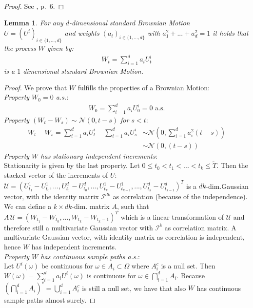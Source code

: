 \documentclass[12pt]{article}
\newtheorem{lemma}[theorem]{Lemma}
\begin{document}
	\begin{proof}
		See \cite{fima2Lecture}, p.\ 6. %
	\end{proof}
	\begin{lemma}\label{lm:linearcombiofbmisbm}
		For any $d$-dimensional standard Brownian Motion $U = (U^i)_{i\in\{1, ..., d\}}$ and weights $(a_i)_{i\in\{1,..., d\}}$ with $a^2_1 + ... + a^2_d = 1$ it holds that the process $W$ given by:
		\begin{align*}
			W_t = \sum_{i=1}^{d}a_iU^i_t
		\end{align*}
		is a $1$-dimensional standard Brownian Motion.
	\end{lemma} 
	\begin{proof}
		We prove that $W$ fulfills the properties of a Brownian Motion:\\
		\emph{Property $W_0=0$ a.s.}:
		\begin{align*}
			W_0 = \sum_{i=1}^{d}a_iU^i_0 = 0 \text{ a.s.}
		\end{align*}
		\emph{Property $(W_t-W_s) \sim \mathcal{N}(0, t-s)$ for $s < t$}:
		\begin{align*}
			W_t - W_s = \sum_{i=1}^{d}a_iU^i_t - \sum_{i=1}^{d}a_iU^i_s &\sim \mathcal{N}\left(0, \sum_{i=1}^{d}a^2_i(t-s)\right)\\
			&\sim \mathcal{N}\left(0, (t-s)\right)
		\end{align*}
		\emph{Property $W$ has stationary independent increments}:\\
		Stationarity is given by the last property. Let $0 \le t_0 < t_1 <...<t_k \le \tilde{T}$. Then the stacked vector of the increments of $U$: $\mathcal{U} = (U^1_{t_1} -U^1_{t_0}, ...,U^d_{t_1} -U^d_{t_0}, ..., U^1_{t_k} -U^1_{t_{k-1}}, ..., U^d_{t_k} -U^d_{t_{k-1}})^T$ is a $dk$-dim.\;Gaussian vector, with the identity matrix $\mathcal{I}^{dk}$ as correlation (because of the independence). We can define a $k \times dk$-dim. matrix $A$, such that $A\,\mathcal{U} = (W_{t_1}-W_{t_0}, ..., W_{t_k}-W_{t_k-1})^T$ which is a linear transformation of $\mathcal{U}$ and therefore still a multivariate Gaussian vector with $\mathcal{I}^{k}$ as correlation matrix. A multivariate Gaussian vector, with identity matrix as correlation is independent, hence $W$ has independent increments.
		\\
		\emph{Property $W$ has continuous sample paths a.s.}:\\
		Let $U^i(\omega)$ be continuous for $\omega \in A_i\subset\Omega$ where $A_i^c$ is a null set. Then $W(\omega) = \sum_{i=1}^{d}a_iU^i(\omega)$ is continuous for $\omega \in \bigcap_{i=1}^dA_i$. Because $\left(\bigcap_{i=1}^dA_i\right)^c = \bigcup_{i=1}^dA^c_i$ is still a null set, we have that also $W$ has continuous sample paths almost surely.
	\end{proof}
	
\end{document}
